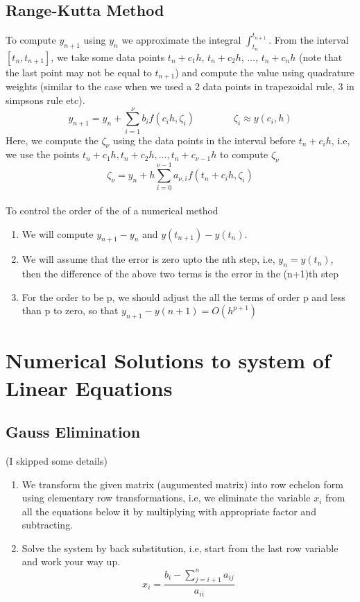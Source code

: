 \documentclass{article}
\begin{document}
	\subsection{Range-Kutta Method}
		To compute $y_{n+1}$ using $y_n$ we approximate the integral $\int_{t_n}^{t_{n+1}}$. From the interval $[t_n,t_{n+1}]$, we take some data points $t_n + c_1 h$, $t_n + c_2 h$, $\hdots$, $t_n + c_n h$ (note that the last point may not be equal to $t_{n+1}$) and compute the value using quadrature weights (similar to the case when we used a 2 data points in trapezoidal rule, 3 in simpsons rule etc). 
			\[y_{n+1} = y_n + \sum_{i=1}^\nu b_i f(c_i h, \zeta_i) \qquad \qquad \zeta_i \approx y(c_i,h)\]
		Here, we compute the $\zeta_\nu$ using the data points in the interval before $t_n + c_i h$, i.e, we use the points $t_n + c_1 h, t_n + c_2 h, \hdots, t_n + c_{\nu - 1}h$ to compute $\zeta_\nu$
			\[\zeta_\nu = y_n + h \sum_{i=0}^{\nu -1} a_{\nu,i} f(t_n + c_i h, \zeta_i) \]
			\\

		To control the order of the of a numerical method
		\begin{enumerate}
		\item We will compute $y_{n+1} - y_n$ and $y(t_{n+1})- y(t_n)$. 
		\item We will assume that the error is zero upto the nth step, i.e, $y_n = y(t_n)$, then the difference of the above two terms is the error in the (n+1)th step
		\item For the order to be p, we should adjust the all the terms of order p and less than p to zero, so that $y_{n+1}- y(n+1) = O(h^{p+1})$
		\end{enumerate}



\pagebreak

\section{Numerical Solutions to system of Linear Equations}
	
	\subsection{Gauss Elimination}
	({I skipped some details})
		\begin{enumerate}
			\item We transform the given matrix (augumented matrix) into row echelon form using elementary row transformations, i.e, we eliminate the variable $x_i$ from all the equations below it by multiplying with appropriate factor and subtracting. 
			\item Solve the system by back substitution, i.e, start from the last row variable and work your way up.
			\[x_i = \frac{b_i - \sum_{j=i+1}^n a_{ij}}{a_{ii}}\]
		\end{enumerate}
\end{document}
